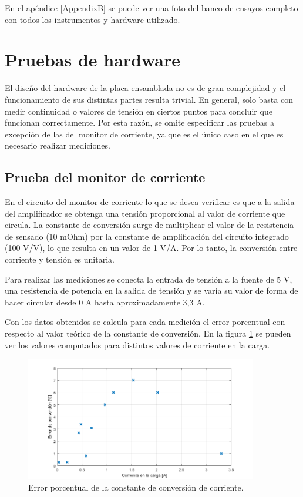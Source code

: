 En el apéndice \ref{AppendixB} se puede ver una foto del banco de ensayos completo con todos los instrumentos y hardware utilizado.

\section{Pruebas de hardware}
\label{sec:pruebasHW}

El diseño del hardware de la placa ensamblada no es de gran complejidad y el funcionamiento de sus distintas partes resulta trivial. En general, solo basta con medir continuidad o valores de tensión en ciertos puntos para concluir que funcionan correctamente. Por esta razón, se omite especificar las pruebas a excepción de las del monitor de corriente, ya que es el único caso en el que es necesario realizar mediciones.

\subsection{Prueba del monitor de corriente}
\label{sec:monCorr}

En el circuito del monitor de corriente lo que se desea verificar es que a la salida del amplificador se obtenga una tensión proporcional al valor de corriente que circula. La constante de conversión surge de multiplicar el valor de la resistencia de sensado (10 mOhm) por la constante de amplificación del circuito integrado (100 V/V), lo que resulta en un valor de 1 V/A. Por lo tanto, la conversión entre corriente y tensión es unitaria.

Para realizar las mediciones se conecta la entrada de tensión a la fuente de 5 V, una resistencia de potencia en la salida de tensión y se varía su valor de forma de hacer circular desde 0 A hasta aproximadamente 3,3 A.

Con los datos obtenidos se calcula para cada medición el error porcentual con respecto al valor teórico de la constante de conversión. En la figura \ref{fig:testMonCorr} se pueden ver los valores computados para distintos valores de corriente en la carga.

\begin{figure}[H]
\centering
\includegraphics[width=0.9\textwidth]{./Figures/testMonCorr.png}
\caption{Error porcentual de la constante de conversión de corriente.}
\label{fig:testMonCorr}
\end{figure}

